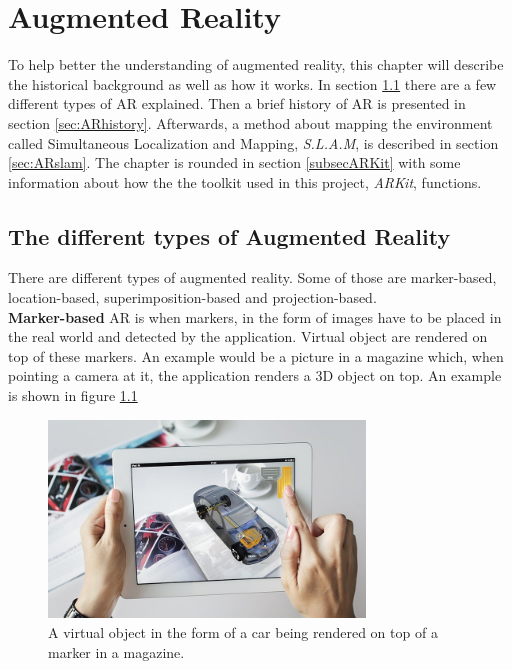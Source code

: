 \chapter{Augmented Reality}

To help better the understanding of augmented reality, this chapter will describe the historical background as well as how it works. In section \ref{sec:ARtype} there
are a few different types of AR explained. Then a brief history of AR is presented in section \ref{sec:ARhistory}. Afterwards, a method about mapping the environment called Simultaneous Localization and Mapping, \textit{S.L.A.M}, is described in section \ref{sec:ARslam}. The chapter is rounded in section \ref{subsecARKit} with some information about how the the toolkit used in this project, \textit{ARKit}, functions. 

\section{The different types of Augmented Reality}
\label{sec:ARtype}
There are different types of augmented reality. Some of those are marker-based, location-based, superimposition-based and projection-based. \\

\textbf{Marker-based} AR is when markers, in the form of images have to be placed in the real world and detected by the application. Virtual object are rendered on top of these markers. An example would be a picture in a magazine which, when pointing a camera at it, the application renders a 3D object on top. An example is shown in figure \ref{fig:marker-based-ar} \\

\begin{figure}[hbtp]
\begin{center}
\includegraphics[width = 0.75\textwidth]{./Images/markerbasedar.jpg} 
\caption{A virtual object in the form of a car being rendered on top of a marker in a magazine.}
\label{fig:marker-based-ar}
\end{center}
\end{figure}

